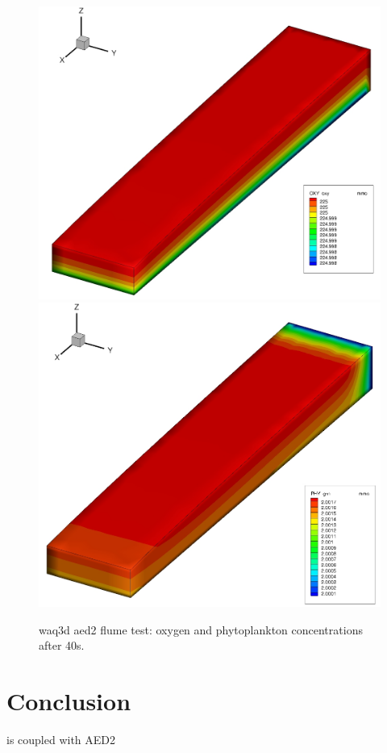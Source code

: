 \begin{figure} [H]
\centering
\includegraphics[scale=0.3]{flume_oxy.jpg}
\includegraphics[scale=0.3]{flume_phyto.jpg}
 \caption{waq3d aed2 flume test: oxygen and phytoplankton concentrations after 40s.}
 \label{fig:res}
\end{figure}


%
\section{Conclusion}
%
 is coupled with AED2
%
%

